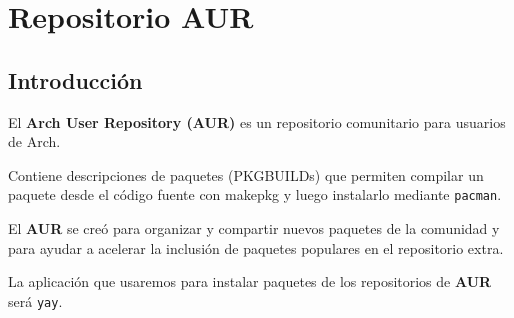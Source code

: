 \section{Repositorio AUR}
\subsection{Introducción}

	El \textbf{Arch User Repository (AUR)} es un repositorio comunitario para usuarios de Arch.\vspace{5mm}

	Contiene descripciones de paquetes (PKGBUILDs) que permiten compilar un paquete desde el código fuente con makepkg y luego instalarlo mediante {\color{brown}\texttt{pacman}}.\vspace{5mm}

  El \textbf{AUR} se creó para organizar y compartir nuevos paquetes de la comunidad y para ayudar a acelerar la inclusión de paquetes populares en el repositorio extra.\vspace{5mm}

	La aplicación que usaremos para instalar paquetes de los repositorios de \textbf{AUR} será {\color{brown}\texttt{yay}}.
